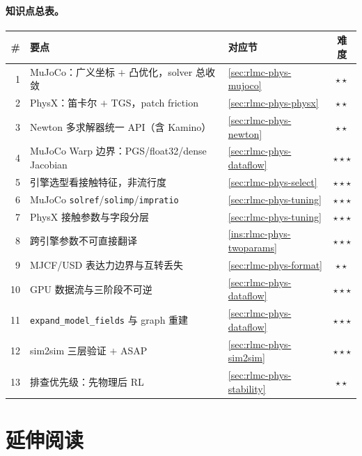 \paragraph{知识点总表。}

\begin{center}
\small
\begin{tabular}{@{}rp{6.4cm}lc@{}}
\toprule
\# & 要点 & 对应节 & 难度 \\
\midrule
1 & MuJoCo：广义坐标 $+$ 凸优化，solver 总收敛 & \cref{sec:rlmc-phys-mujoco} & $\star\star$ \\
2 & PhysX：笛卡尔 $+$ TGS，patch friction & \cref{sec:rlmc-phys-physx} & $\star\star$ \\
3 & Newton 多求解器统一 API（含 Kamino） & \cref{sec:rlmc-phys-newton} & $\star\star$ \\
4 & MuJoCo Warp 边界：PGS/float32/dense Jacobian & \cref{sec:rlmc-phys-dataflow} & $\star\star\star$ \\
5 & 引擎选型看接触特征，非流行度 & \cref{sec:rlmc-phys-select} & $\star\star\star$ \\
6 & MuJoCo \verb|solref|/\verb|solimp|/\verb|impratio| & \cref{sec:rlmc-phys-tuning} & $\star\star\star$ \\
7 & PhysX 接触参数与字段分层 & \cref{sec:rlmc-phys-tuning} & $\star\star\star$ \\
8 & 跨引擎参数不可直接翻译 & \cref{ins:rlmc-phys-twoparams} & $\star\star\star$ \\
9 & MJCF/USD 表达力边界与互转丢失 & \cref{sec:rlmc-phys-format} & $\star\star$ \\
10 & GPU 数据流与三阶段不可逆 & \cref{sec:rlmc-phys-dataflow} & $\star\star\star$ \\
11 & \verb|expand_model_fields| 与 graph 重建 & \cref{sec:rlmc-phys-dataflow} & $\star\star\star$ \\
12 & sim2sim 三层验证 $+$ ASAP & \cref{sec:rlmc-phys-sim2sim} & $\star\star\star$ \\
13 & 排查优先级：先物理后 RL & \cref{sec:rlmc-phys-stability} & $\star\star$ \\
\bottomrule
\end{tabular}
\end{center}

\section*{延伸阅读}
\label{sec:rlmc-phys-further}

